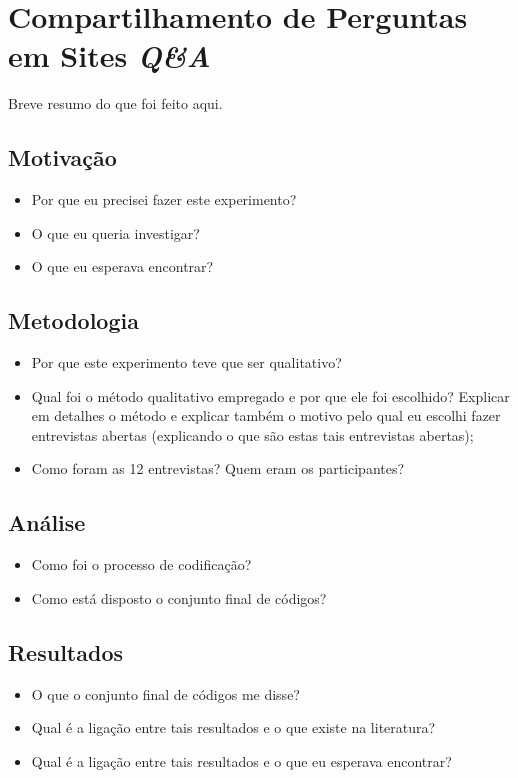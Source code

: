 \chapter{Compartilhamento de Perguntas em Sites \textit{Q\&A}}
Breve resumo do que foi feito aqui.
\section{Motivação}
\begin{itemize}
\item Por que eu precisei fazer este experimento? 
\item O que eu queria investigar?
\item O que eu esperava encontrar?
\end{itemize}
\section{Metodologia}
\begin{itemize}
\item Por que este experimento teve que ser qualitativo?
\item Qual foi o método qualitativo empregado e por que ele foi escolhido? Explicar em detalhes o método e explicar também o motivo pelo qual eu escolhi fazer entrevistas abertas (explicando o que são estas tais entrevistas abertas);
\item Como foram as 12 entrevistas? Quem eram os participantes?
\end{itemize}
\section{Análise}
\begin{itemize}
\item Como foi o processo de codificação?
\item Como está disposto o conjunto final de códigos?
\end{itemize}
\section{Resultados}
\begin{itemize}
\item O que o conjunto final de códigos me disse?
\item Qual é a ligação entre tais resultados e o que existe na literatura?
\item Qual é a ligação entre tais resultados e o que eu esperava encontrar?
\end{itemize}